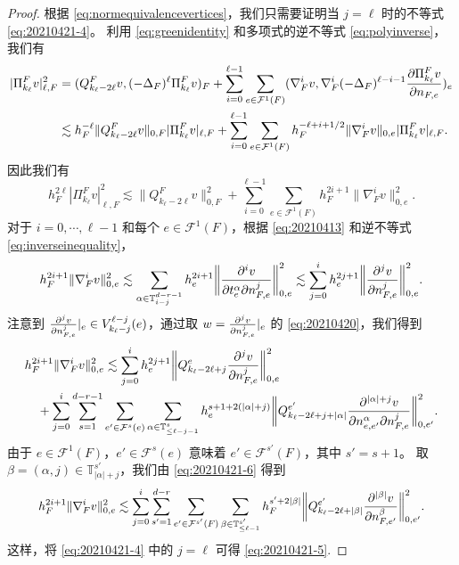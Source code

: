\begin{proof}
根据 \eqref{eq:normequivalencevertices}，我们只需要证明当 $j=\ell$ 时的不等式 \eqref{eq:20210421-4}。
利用 \eqref{eq:greenidentity} 和多项式的逆不等式 \eqref{eq:polyinverse}，我们有
\begin{align*}
|\Pi_{k_{\ell}}^Fv|_{\ell,F}^2&=(Q_{k_{\ell}-2\ell}^Fv, (-\Delta_F)^{\ell}\Pi_{k_{\ell}}^Fv)_F+\sum_{i=0}^{\ell-1}\sum_{e\in\mathcal F^1(F)}(\nabla_F^{i}v, \nabla_F^{i}(-\Delta_F)^{\ell-i-1}\frac{\partial\Pi_{k_{\ell}}^Fv}{\partial n_{F,e}})_{e} \\
&\lesssim h_F^{-\ell}\|Q_{k_{\ell}-2\ell}^Fv\|_{0,F}|\Pi_{k_{\ell}}^Fv|_{\ell,F}+\sum_{i=0}^{\ell-1}\sum_{e\in\mathcal F^1(F)}h_F^{-\ell+i+1/2}\|\nabla_F^{i}v\|_{0,e}|\Pi_{k_{\ell}}^Fv|_{\ell,F}.
\end{align*}
因此我们有
\begin{equation}\label{eq:20210421-5}
h_F^{2\ell}|\Pi_{k_{\ell}}^Fv|_{\ell,F}^2\lesssim \|Q_{k_{\ell}-2\ell}^Fv\|_{0,F}^2 +\sum_{i=0}^{\ell-1}\sum_{e\in\mathcal F^1(F)}h_F^{2i+1}\|\nabla_F^{i}v\|_{0,e}^2.
\end{equation}
对于 $i=0,\cdots,\ell-1$ 和每个 $e\in\mathcal F^1(F)$，根据 \eqref{eq:20210413} 和逆不等式 \eqref{eq:inverseinequality}，
$$
h_F^{2i+1}\|\nabla_F^{i}v\|_{0,e}^2
\lesssim \sum_{\alpha\in \mathbb{T}^{d-r-1}_{i-j}}h_e^{2i+1}\bigg\|\frac{\partial^{i}v}{\partial t_e^{\alpha}\partial n_{F,e}^{j}}\bigg\|_{0,e}^2 \lesssim \sum_{j=0}^ih_e^{2j+1}\bigg\|\frac{\partial^{j}v}{\partial n_{F,e}^{j}}\bigg\|_{0,e}^2.
$$
注意到 $\frac{\partial^{j}v}{\partial n_{F,e}^{j}}|_e\in V_{k_{\ell}-j}^{\ell-j}(e)$，通过取 $w=\frac{\partial^{j}v}{\partial n_{F,e}^{j}}|_e$ 的 \eqref{eq:20210420}，我们得到
\begin{align}
&h_F^{2i+1}\|\nabla_F^{i}v\|_{0,e}^2\lesssim\sum_{j=0}^ih_e^{2j+1}\bigg\|Q_{k_{\ell}-2\ell+j}^e\frac{\partial^{j}v}{\partial n_{F,e}^{j}}\bigg\|_{0,e}^2 \notag\\
&\quad+\sum_{j=0}^{i}\sum_{s=1}^{d-r-1}\sum_{e'\in\mathcal
F^{s}(e)}\sum_{\alpha\in \mathbb{T}^{s}_{\leq \ell-j-1}}h_e^{s+1+2(|\alpha|+j)}\bigg\|Q_{k_{\ell}-2\ell+j+|\alpha|}^{e'}\frac{\partial^{|\alpha|+j}v}{\partial n_{e,e'}^{\alpha}\partial n_{F,e}^{j}}\bigg\|_{0,e'}^2. \label{eq:20210421-6}
\end{align}
由于 $e\in\mathcal F^1(F)$，$e'\in\mathcal F^{s}(e)$ 意味着 $e'\in\mathcal F^{s'}(F)$，其中 $s'=s+1$。
取 $\beta=(\alpha,j)\in \mathbb{T}^{s'}_{|\alpha|+j}$，我们由 \eqref{eq:20210421-6} 得到
\begin{equation}\label{eq:20220301-1}
\resizebox{0.9\textwidth}{!}{$\displaystyle
h_F^{2i+1}\|\nabla_F^{i}v\|_{0,e}^2\lesssim
\sum_{j=0}^{i}\sum_{s'=1}^{d-r}\sum_{e'\in\mathcal F^{s'}(F)}\sum_{\beta\in
\mathbb{T}^{s'}_{\leq
\ell-1}}h_F^{s'+2|\beta|}\bigg\|Q_{k_{\ell}-2\ell+|\beta|}^{e'}\frac{\partial^{|\beta|}v}{\partial
\nnn_{F,e'}^{\beta}}\bigg\|_{0,e'}^2. 
$}
\end{equation}
这样，将 \eqref{eq:20210421-4} 中的 $j=\ell$ 可得 \eqref{eq:20210421-5}.
\end{proof}

